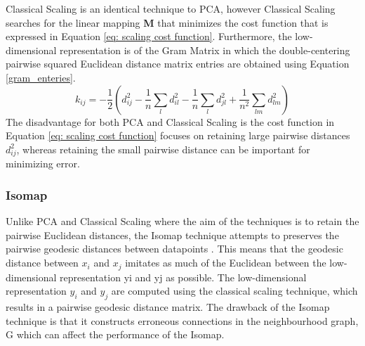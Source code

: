 \documentclass[11pt,twocolumn]{witseiepaper}
\begin{document}
	Classical Scaling is an identical technique to PCA, however Classical Scaling searches for the linear mapping \textbf{M} that minimizes the cost function that is expressed in Equation \ref{eq: scaling cost function}. Furthermore, the low-dimensional representation is of the Gram Matrix in which the double-centering pairwise squared Euclidean distance matrix entries are obtained using Equation \ref{gram_enteries}.
	\begin{equation}
	k_{ij} = -\frac{1}{2}(d_{ij}^{2}-\frac{1}{n}\sum_{l}d_{il}^{2} - \frac{1}{n}\sum_{l}d_{jl}^{2} + \frac{1}{n^2}\sum_{lm}d_{lm}^{2})
	\label{gram_enteries}
	\end{equation}
	The disadvantage for both PCA and Classical Scaling is the cost function in Equation \ref{eq: scaling cost function} focuses on retaining large pairwise distances $d_{ij}^2$, whereas retaining the small pairwise distance can be important for minimizing error.
	
	\subsubsection{Isomap}
	Unlike PCA and Classical Scaling where the aim of the techniques is to retain the pairwise Euclidean distances, the Isomap technique attempts to preserves the pairwise
	geodesic distances between datapoints \cite{Zhang2012}. This means that the geodesic distance between $x_i$ and $x_j$ imitates as much of the Euclidean between the low-dimensional representation yi and yj as possible. The low-dimensional representation $y_i$ and $y_j$ are computed using the classical scaling technique, which results in a pairwise geodesic distance matrix. The drawback of the Isomap technique is that it constructs erroneous connections in the neighbourhood graph, G which can affect the performance of the Isomap.
	
\end{document}
